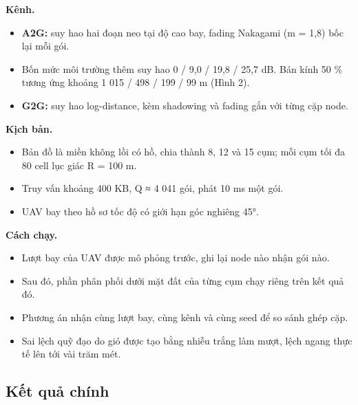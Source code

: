 \textbf{Kênh.}

\begin{itemize}
\tightlist
\item
  \textbf{A2G:} suy hao hai đoạn neo tại độ cao bay, fading Nakagami (m
  = 1,8) bốc lại mỗi gói.
\item
  Bốn mức môi trường thêm suy hao 0 / 9,0 / 19,8 / 25,7 dB. Bán kính 50
  \% tương ứng khoảng 1 015 / 498 / 199 / 99 m (Hình 2).
\item
  \textbf{G2G:} suy hao log-distance, kèm shadowing và fading gắn với
  từng cặp node.
\end{itemize}

\textbf{Kịch bản.}

\begin{itemize}
\tightlist
\item
  Bản đồ là miền không lồi có hồ, chia thành 8, 12 và 15 cụm; mỗi cụm
  tối đa 80 cell lục giác R = 100 m.
\item
  Truy vấn khoảng 400 KB, Q ≈ 4 041 gói, phát 10 ms một gói.
\item
  UAV bay theo hồ sơ tốc độ có giới hạn góc nghiêng 45°.
\end{itemize}

\textbf{Cách chạy.}

\begin{itemize}
\tightlist
\item
  Lượt bay của UAV được mô phỏng trước, ghi lại node nào nhận gói nào.
\item
  Sau đó, phần phân phối dưới mặt đất của từng cụm chạy riêng trên kết
  quả đó.
\item
  Phương án nhận cùng lượt bay, cùng kênh và cùng seed để so sánh ghép
  cặp.
\item
  Sai lệch quỹ đạo do gió được tạo bằng nhiễu trắng làm mượt, lệch ngang
  thực tế lên tới vài trăm mét.
\end{itemize}

\subsection{Kết quả chính}

